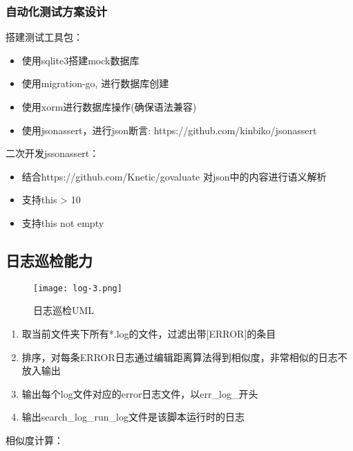 \subsubsection{自动化测试方案设计}

搭建测试工具包：
\begin{itemize}
    \item 使用sqlite3搭建mock数据库
    \item 使用migration-go, 进行数据库创建
    \item 使用xorm进行数据库操作(确保语法兼容)
    \item 使用jsonassert，进行json断言: https://github.com/kinbiko/jsonassert
\end{itemize}


二次开发jssonassert：
\begin{itemize}
    \item 结合https://github.com/Knetic/govaluate 对json中的内容进行语义解析
    \item 支持this > 10
    \item 支持this not empty
\end{itemize}


\subsection{日志巡检能力}

\begin{figure}[H]
    \centering
    \texttt{[image: log-3.png]}
    \caption{日志巡检UML}
    \label{fig:日志巡检UML}
\end{figure}

\begin{enumerate}
    \item 取当前文件夹下所有*.log的文件，过滤出带[ERROR]的条目
    \item 排序，对每条ERROR日志通过编辑距离算法得到相似度，非常相似的日志不放入输出
    \item 输出每个log文件对应的error日志文件，以err\_log\_开头
    \item 输出search\_log\_run\_log文件是该脚本运行时的日志
\end{enumerate}

相似度计算：
%

